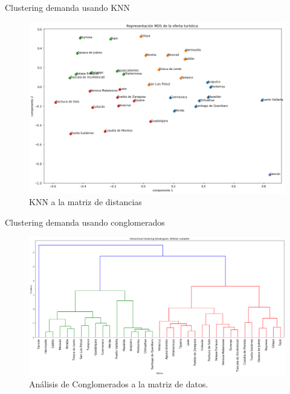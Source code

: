 \begin{frame}{Clustering demanda usando KNN}
    \begin{figure}
        \centering
        \includegraphics[scale=0.335]{figure/knn_demanda_c.png}
        \caption{KNN a la matriz de distancias}
        \label{fig:knn_demanda_c}
    \end{figure}
\end{frame}

\begin{frame}{Clustering demanda usando conglomerados}
    \begin{figure}
        \centering
        \includegraphics[scale=0.22]{figure/herarquico_demanda_c.png}
        \caption{Análisis de Conglomerados a la matriz de datos.}
        \label{fig:knn_oferta_c}
    \end{figure}
\end{frame}



